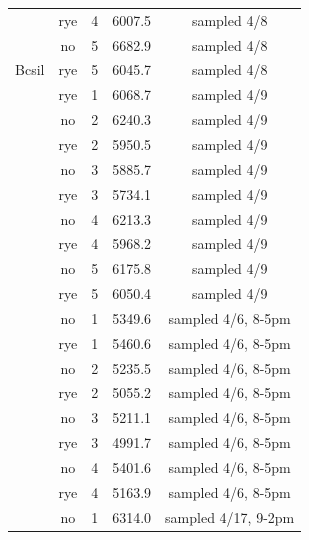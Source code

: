 \documentclass[
]{article}
\begin{document}
\begin{table}[H]
\begin{tabular}[t]{ccccc}
 & rye & 4 & 6007.5 & sampled 4/8\\

\rowcolor{gray!6}   & no & 5 & 6682.9 & sampled 4/8\\

\multirow[t]{-10}{*}{\centering\arraybackslash Bcsil} & rye & 5 & 6045.7 & sampled 4/8\\
\cmidrule{1-5}
\rowcolor{gray!6}   & rye & 1 & 6068.7 & sampled 4/9\\

 & no & 2 & 6240.3 & sampled 4/9\\

\rowcolor{gray!6}   & rye & 2 & 5950.5 & sampled 4/9\\

 & no & 3 & 5885.7 & sampled 4/9\\

\rowcolor{gray!6}   & rye & 3 & 5734.1 & sampled 4/9\\

 & no & 4 & 6213.3 & sampled 4/9\\

\rowcolor{gray!6}   & rye & 4 & 5968.2 & sampled 4/9\\

 & no & 5 & 6175.8 & sampled 4/9\\

\rowcolor{gray!6}  \multirow[t]{-9}{*}{\centering\arraybackslash BS} & rye & 5 & 6050.4 & sampled 4/9\\
\cmidrule{1-5}
 & no & 1 & 5349.6 & sampled 4/6, 8-5pm\\

\rowcolor{gray!6}   & rye & 1 & 5460.6 & sampled 4/6, 8-5pm\\

 & no & 2 & 5235.5 & sampled 4/6, 8-5pm\\

\rowcolor{gray!6}   & rye & 2 & 5055.2 & sampled 4/6, 8-5pm\\

 & no & 3 & 5211.1 & sampled 4/6, 8-5pm\\

\rowcolor{gray!6}   & rye & 3 & 4991.7 & sampled 4/6, 8-5pm\\

 & no & 4 & 5401.6 & sampled 4/6, 8-5pm\\

\rowcolor{gray!6}  \multirow[t]{-8}{*}{\centering\arraybackslash East} & rye & 4 & 5163.9 & sampled 4/6, 8-5pm\\
\cmidrule{1-5}
 & no & 1 & 6314.0 & sampled 4/17, 9-2pm\\


\end{tabular}
\end{table}
\end{document}
